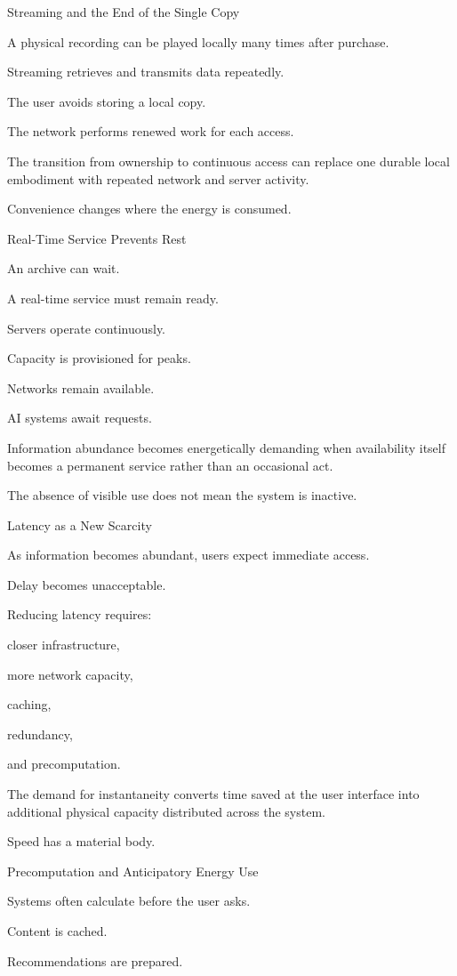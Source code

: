 Streaming and the End of the Single Copy

A physical recording can be played locally many times after purchase.

Streaming retrieves and transmits data repeatedly.

The user avoids storing a local copy.

The network performs renewed work for each access.

The transition from ownership to continuous access can replace one durable local embodiment with repeated network and server activity.

Convenience changes where the energy is consumed.

Real-Time Service Prevents Rest

An archive can wait.

A real-time service must remain ready.

Servers operate continuously.

Capacity is provisioned for peaks.

Networks remain available.

AI systems await requests.

Information abundance becomes energetically demanding when availability itself becomes a permanent service rather than an occasional act.

The absence of visible use does not mean the system is inactive.

Latency as a New Scarcity

As information becomes abundant, users expect immediate access.

Delay becomes unacceptable.

Reducing latency requires:

closer infrastructure,

more network capacity,

caching,

redundancy,

and precomputation.

The demand for instantaneity converts time saved at the user interface into additional physical capacity distributed across the system.

Speed has a material body.

Precomputation and Anticipatory Energy Use

Systems often calculate before the user asks.

Content is cached.

Recommendations are prepared.

